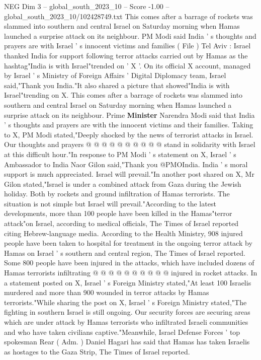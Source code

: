 \begin{textsample}{NEG Dim 3 – global\_south\_2023\_10 – Score -1.00 – global\_south\_2023\_10/102428749.txt}  \label{ex:f3_neg_022}
This comes after a barrage of rockets was slammed into southern and central Israel on Saturday morning when Hamas launched a surprise attack on its neighbour.
PM Modi said India ' s thoughts and prayers are with Israel ' s innocent victims and families ( File ) Tel Aviv : Israel thanked India for support following terror attacks carried out by Hamas as the hashtag"India is with Israel"trended on ' X '.
On its official X account, managed by Israel ' s Ministry of Foreign Affairs ' Digital Diplomacy team, Israel said,"Thank you India."It also shared a picture that showed"India is with Israel"trending on X.
This comes after a barrage of rockets was slammed into southern and central Israel on Saturday morning when Hamas launched a surprise attack on its neighbour.
Prime \textbf{Minister} Narendra Modi said that India ' s thoughts and prayers are with the innocent victims and their families.
Taking to X, PM Modi stated,"Deeply shocked by the news of terrorist attacks in Israel.
Our thoughts and prayers @ @ @ @ @ @ @ @ @ @ stand in solidarity with Israel at this difficult hour."In response to PM Modi ' s statement on X, Israel ' s Ambassador to India Naor Gilon said,"Thank you @PMOIndia.
India ' s moral support is much appreciated.
Israel will prevail."In another post shared on X, Mr Gilon stated,"Israel is under a combined attack from Gaza during the Jewish holiday.
Both by rockets and ground infiltration of Hamas terrorists.
The situation is not simple but Israel will prevail."According to the latest developments, more than 100 people have been killed in the Hamas"terror attack"on Israel, according to medical officials, The Times of Israel reported citing Hebrew-language media.
According to the Health Ministry, 908 injured people have been taken to hospital for treatment in the ongoing terror attack by Hamas on Israel ' s southern and central region, The Times of Israel reported.
Some 800 people have been injured in the attacks, which have included dozens of Hamas terrorists infiltrating @ @ @ @ @ @ @ @ @ @ injured in rocket attacks.
In a statement posted on X, Israel ' s Foreign Ministry stated,"At least 100 Israelis murdered and more than 900 wounded in terror attacks by Hamas terrorists."While sharing the post on X, Israel ' s Foreign Ministry stated,"The fighting in southern Israel is still ongoing.
Our security forces are securing areas which are under attack by Hamas terrorists who infiltrated Israeli communities and who have taken civilians captive."Meanwhile, Israel Defense Forces ' top spokesman Rear ( Adm. ) Daniel Hagari has said that Hamas has taken Israelis as hostages to the Gaza Strip, The Times of Israel reported.

\end{textsample}
